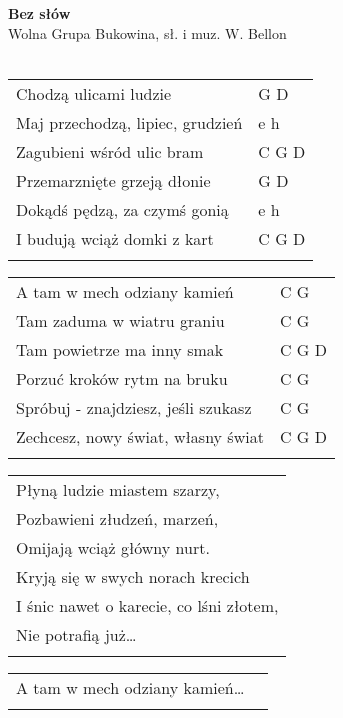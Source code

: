 \documentclass[a5paper]{article}
\begin{document}


\noindent
\fontsize{12pt}{15pt}\selectfont
\textbf{Bez słów} \\
\fontsize{8pt}{10pt}\selectfont
Wolna Grupa Bukowina, sł. i muz. W. Bellon \\ \\
\fontsize{10pt}{12pt}\selectfont
{}
\begin{tabular}{@{}p{9cm}p{3cm}@{}}
\noindent
Chodzą ulicami ludzie & G D \\
Maj przechodzą, lipiec, grudzień & e h \\
Zagubieni wśród ulic bram & C G D \\
Przemarznięte grzeją dłonie & G D \\
Dokądś pędzą, za czymś gonią & e h \\
I budują wciąż domki z kart & C G D \\ \\
\end{tabular}

\noindent
\begin{tabular}{@{}p{8cm}p{3cm}@{}}
A tam w mech odziany kamień & C G \\
Tam zaduma w wiatru graniu & C G \\
Tam powietrze ma inny smak & C G D \\
Porzuć kroków rytm na bruku & C G \\
Spróbuj - znajdziesz, jeśli szukasz & C G \\
Zechcesz, nowy świat, własny świat & C G D \\ \\
\end{tabular}

\noindent
\begin{tabular}{@{}p{9.5cm}@{}}
Płyną ludzie miastem szarzy, \\
Pozbawieni złudzeń, marzeń, \\
Omijają wciąż główny nurt. \\
Kryją się w swych norach krecich \\
I śnic nawet o karecie, co lśni złotem, \\
Nie potrafią już… \\ \\
\end{tabular}

\noindent
\begin{tabular}{@{}p{8.5cm}p{3cm}@{}} 
A tam w mech odziany kamień… \\ \\
\end{tabular} 
\end{document}
